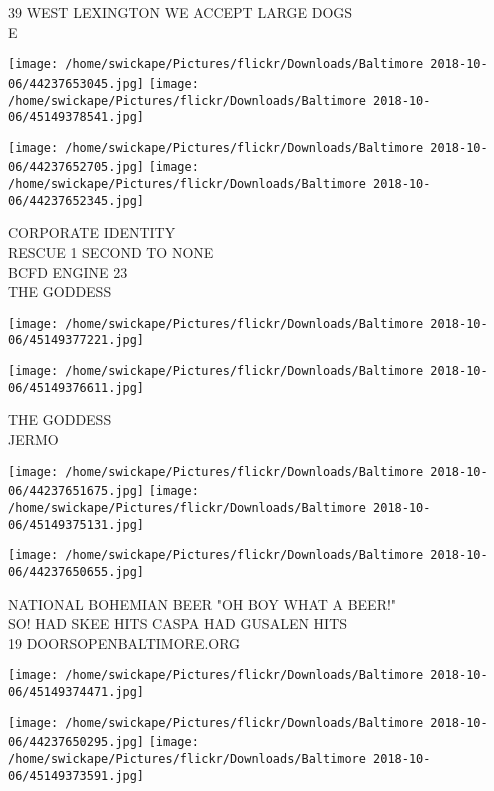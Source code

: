 \documentclass[10pt,letterpaper]{article}
\begin{document}
39 WEST LEXINGTON WE ACCEPT LARGE DOGS\\
E\\
\pagebreak

\texttt{[image: /home/swickape/Pictures/flickr/Downloads/Baltimore 2018-10-06/44237653045.jpg]}
\texttt{[image: /home/swickape/Pictures/flickr/Downloads/Baltimore 2018-10-06/45149378541.jpg]}

\texttt{[image: /home/swickape/Pictures/flickr/Downloads/Baltimore 2018-10-06/44237652705.jpg]}
\texttt{[image: /home/swickape/Pictures/flickr/Downloads/Baltimore 2018-10-06/44237652345.jpg]}

CORPORATE IDENTITY\\
RESCUE 1 SECOND TO NONE\\
BCFD ENGINE 23\\
THE GODDESS\\
\pagebreak

\texttt{[image: /home/swickape/Pictures/flickr/Downloads/Baltimore 2018-10-06/45149377221.jpg]}

\vspace{0.25in}
\texttt{[image: /home/swickape/Pictures/flickr/Downloads/Baltimore 2018-10-06/45149376611.jpg]}

THE GODDESS\\
JERMO\\
\pagebreak

\texttt{[image: /home/swickape/Pictures/flickr/Downloads/Baltimore 2018-10-06/44237651675.jpg]}
\texttt{[image: /home/swickape/Pictures/flickr/Downloads/Baltimore 2018-10-06/45149375131.jpg]}

\texttt{[image: /home/swickape/Pictures/flickr/Downloads/Baltimore 2018-10-06/44237650655.jpg]}

NATIONAL BOHEMIAN BEER "OH BOY WHAT A BEER!"\\
SO!  HAD SKEE HITS CASPA HAD GUSALEN HITS\\
19 DOORSOPENBALTIMORE.ORG\\
\pagebreak

\texttt{[image: /home/swickape/Pictures/flickr/Downloads/Baltimore 2018-10-06/45149374471.jpg]}

\vspace{0.25in}
\texttt{[image: /home/swickape/Pictures/flickr/Downloads/Baltimore 2018-10-06/44237650295.jpg]}
\texttt{[image: /home/swickape/Pictures/flickr/Downloads/Baltimore 2018-10-06/45149373591.jpg]}
\end{document}
